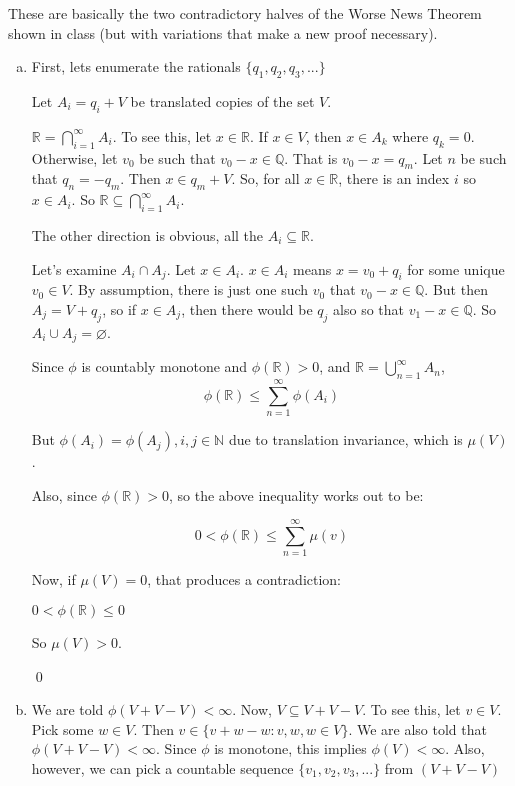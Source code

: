 \documentclass[11pt,oneside]{article}
\numberwithin{equation}{section}
\theoremstyle{definition}
\def\RR{\mathbb{R}}
\def\QQ{\mathbb{Q}}
\def\NN{\mathbb{N}}
\begin{document}
\begin{solution}
  These are basically the two contradictory halves of the Worse News
  Theorem shown in class (but with variations that make a new proof
  necessary).  
  \begin{enumerate}[(a)]
  \item

    First, lets enumerate the rationals $\{ q_1, q_2, q_3, ... \}$ 
    
    Let $A_i = q_i + V$ be translated copies of the set $V$.

    $ \RR = \bigcap \limits _ {i=1} ^ \infty A_i$.  To see this, let $x \in \RR$.  If $x \in V$, then
    $ x \in A_k$ where $q_k = 0$.  Otherwise, let $v_0$ be such that $v_0 - x \in \QQ$.
    That is $v_0 - x = q_m$.  Let $n$ be such that $q_n = -q_m$.  Then $x \in q_m + V$.  So, for all
    $x \in \RR$, there is an index $i$ so $x \in A_i$.  So $\RR \subseteq \bigcap \limits _ {i=1} ^ \infty A_i$.

    The other direction is obvious, all the $A_i \subseteq \RR$.  

    Let's examine $A_i \cap A_j$.  Let $x \in A_i$.  $x \in A_i$ means
    $x = v_0 + q_i$ for some unique $v_0 \in V$. By assumption, there
    is just one such $v_0$ that $v_0 - x \in \QQ$.  But then $A_j = V + q_j$, so if $x \in A_j$, then
    there would be $q_j$ also so that $v_1 - x \in \QQ$.  So $A_i \cup A_j = \varnothing$.

    Since $\phi$ is countably monotone and $\phi (\RR) > 0$, and $\RR = \bigcup \limits _ {n = 1} ^ \infty A_n$,
    $$
    \phi ( \RR ) \leq \sum \limits _ {n=1} ^ \infty \phi (A_i)
    $$

    But $\phi(A_i) = \phi(A_j), i, j \in \NN$ due to translation invariance, which is $\mu(V)$.

    Also, since $\phi(\RR) > 0$, so the above inequality works out to be:

    $$
    0 < \phi(\RR) \leq \sum \limits _ {n=1} ^ \infty \mu(v)
    $$

    Now, if $\mu(V) = 0$, that produces a contradiction:

    $ 0 < \phi( \RR) \leq 0$

    So $\mu(V) > 0$.

    \qed
    
  \item
    We are told $\phi(V + V - V) < \infty$.  Now, $V \subseteq V + V -
    V$.  To see this, let $v \in V$.  Pick some $w \in V$.  Then $v
    \in \{ v + w - w : v, w, w \in V \}$.  We are also told that
    $\phi(V + V - V) < \infty$.  Since $\phi$ is monotone, this
    implies $\phi(V) < \infty$.  Also, however, we can pick a
    countable sequence $\{v_1, v_2, v_3, ...\}$ from $(V + V - V)$


\end{enumerate}
\end{solution}
\end{document}
